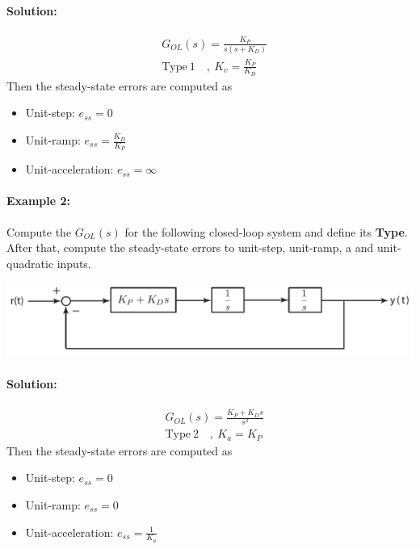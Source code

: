 \documentclass[twoside]{article}
\begin{document}
\paragraph{Solution:} 
%
\begin{align*}
&G_{OL}(s) =  \frac{K_P}{s ( s + K_D)} 
\\
&\mathrm{Type} \ 1  \quad, \ K_v = \frac{K_P}{K_D}
\end{align*}
%
Then the steady-state errors are computed as
\begin{itemize}
\item Unit-step: $e_{ss} = 0$
\item Unit-ramp: $e_{ss} = \frac{K_D}{K_P}$
\item Unit-acceleration: $e_{ss} = \infty$
\end{itemize}

\paragraph{Example 2:} Compute the $G_{OL}(s)$ for the following closed-loop
system and define its \textbf{Type}. After that, compute the steady-state errors to unit-step, unit-ramp, a
and unit-quadratic inputs.

\begin{center}
\begin{minipage}[h]{0.75\linewidth}
    \begin{center}
      \includegraphics[width=\textwidth]{example2}
    \end{center}
\end{minipage}
\end{center}

\paragraph{Solution:} 
%
\begin{align*}
&G_{OL}(s) =  \frac{K_P + K_D s}{s^2} 
\\
&\mathrm{Type} \ 2  \quad, \ K_a = K_P
\end{align*}
%
Then the steady-state errors are computed as
\begin{itemize}
\item Unit-step: $e_{ss} = 0$
\item Unit-ramp: $e_{ss} = 0$
\item Unit-acceleration: $e_{ss} = \frac{1}{K_a}$
\end{itemize}
\end{document}
